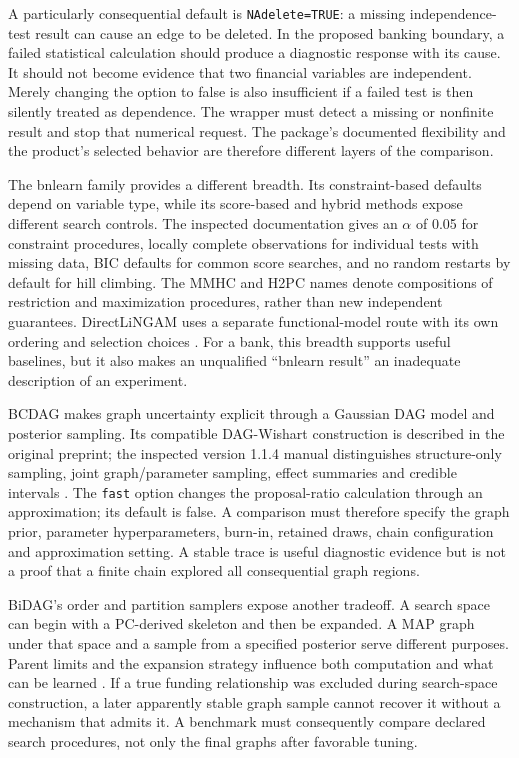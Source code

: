 A particularly consequential default is \texttt{NAdelete=TRUE}: a missing
independence-test result can cause an edge to be deleted. In the proposed
banking boundary, a failed statistical calculation should produce a diagnostic
response with its cause. It should not become evidence that two financial
variables are independent. Merely changing the option to false is also
insufficient if a failed test is then silently treated as dependence. The
wrapper must detect a missing or nonfinite result and stop that numerical
request. The package's documented flexibility and the product's selected
behavior are therefore different layers of the comparison.

The bnlearn family provides a different breadth. Its constraint-based defaults
depend on variable type, while its score-based and hybrid methods expose
different search controls. The inspected documentation gives an $\alpha$ of
0.05 for constraint procedures, locally complete observations for individual
tests with missing data, BIC defaults for common score searches, and no random
restarts by default for hill climbing. The MMHC and H2PC names denote
compositions of restriction and maximization procedures, rather than new
independent guarantees. DirectLiNGAM uses a separate functional-model route
with its own ordering and selection choices \citep{exec13_bnlearn}.
For a bank, this breadth supports useful baselines, but it also makes an
unqualified ``bnlearn result'' an inadequate description of an experiment.

BCDAG makes graph uncertainty explicit through a Gaussian DAG model and
posterior sampling. Its compatible DAG-Wishart construction is described in
the original preprint; the inspected version 1.1.4 manual distinguishes
structure-only sampling, joint graph/parameter sampling, effect summaries and
credible intervals \citep{exec13_bcdag_paper,exec13_bcdag}. The
\texttt{fast} option changes the proposal-ratio calculation through an
approximation; its default is false. A comparison must therefore specify
the graph prior, parameter hyperparameters, burn-in, retained draws, chain
configuration and approximation setting. A stable trace is useful diagnostic
evidence but is not a proof that a finite chain explored all consequential
graph regions.

BiDAG's order and partition samplers expose another tradeoff. A search space
can begin with a PC-derived skeleton and then be expanded. A MAP graph under
that space and a sample from a specified posterior serve different purposes.
Parent limits and the expansion strategy influence both computation and what
can be learned \citep{exec13_bidag}. If a true funding relationship was
excluded during search-space construction, a later apparently stable graph
sample cannot recover it without a mechanism that admits it. A benchmark
must consequently compare declared search procedures, not only the final
graphs after favorable tuning.

